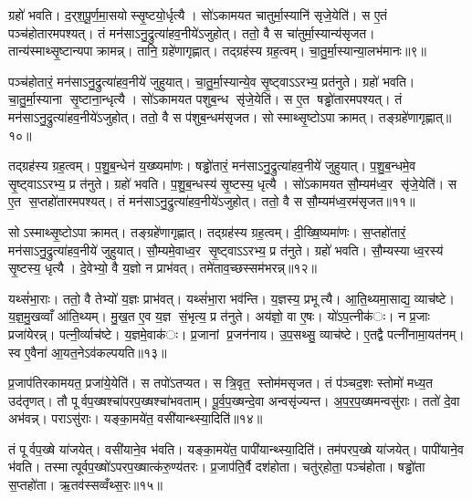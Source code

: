 ग्रहो॑ भवति। द॒र्‌श॒पू॒र्ण॒मा॒सयोस्सृ॒ष्टयो॒र्धृत्यै। सो॑ऽकामयत चातुर्मा॒स्यानि॑ सृजे॒येति॑। स ए॒तं पञ्च॑होतारमपश्यत्। तं मन॑साऽनु॒द्रुत्या॑हव॒नीये॑ऽजुहोत्। ततो॒ वै स चा॑तुर्मा॒स्यान्य॑सृजत। तान्य॑स्माथ्सृ॒ष्टान्यपाक्रामन्न्। तानि॒ ग्रहे॑णागृह्णात्। तद्ग्रह॑स्य ग्रह॒त्वम्। चा॒तु॒र्मा॒स्यान्या॒लभ॑मानः॥९॥

पञ्च॑होतारं॒ मन॑साऽनु॒द्रुत्या॑हव॒नीये॑ जुहुयात्। चा॒तु॒र्मा॒स्यान्ये॒व सृ॒ष्ट्वाऽऽरभ्य॒ प्रत॑नुते। ग्रहो॑ भवति। चा॒तु॒र्मा॒स्याना सृ॒ष्टाना॒न्धृत्यै। सो॑ऽकामयत पशुब॒न्ध सृ॑जे॒येति॑। स ए॒त षड्ढो॑तारमपश्यत्। तं मन॑साऽनु॒द्रुत्या॑हव॒नीये॑ऽजुहोत्। ततो॒ वै स प॑शुब॒न्धम॑सृजत। सोस्माथ्सृ॒ष्टोऽपाक्रामत्। तङ्ग्रहे॑णागृह्णात्॥१०॥

तद्ग्रह॑स्य ग्रह॒त्वम्। प॒शु॒ब॒न्धेन॑ य॒ख्ष्यमा॑णः। षड्ढो॑तारं॒ मन॑साऽनु॒द्रुत्या॑हव॒नीये॑ जुहुयात्। प॒शु॒ब॒न्धमे॒व सृ॒ष्ट्वाऽऽरभ्य॒ प्र त॑नुते। ग्रहो॑ भवति। प॒शु॒ब॒न्धस्य॑ सृ॒ष्टस्य॒ धृत्यै। सो॑ऽकामयत सौ॒म्यम॑ध्व॒र सृ॑जे॒येति॑। स ए॒त स॒प्तहो॑तारमपश्यत्। तं मन॑साऽनु॒द्रुत्या॑हव॒नीये॑ऽजुहोत्। ततो॒ वै स सौ॒म्यम॑ध्व॒रम॑सृजत॥११॥

सोऽस्माथ्सृ॒ष्टोऽपाक्रामत्। तङ्ग्रहे॑णागृह्णात्। तद्ग्रह॑स्य ग्रह॒त्वम्। दी॒ख्षि॒ष्यमा॑णः। स॒प्तहो॑तारं॒ मन॑साऽनु॒द्रुत्या॑हव॒नीये॑ जुहुयात्। सौ॒म्यमे॒वाध्व॒र सृ॒ष्ट्वाऽऽरभ्य॒ प्र त॑नुते। ग्रहो॑ भवति। सौ॒म्यस्याध्व॒रस्य॑ सृ॒ष्टस्य॒ धृत्यै। दे॒वेभ्यो॒ वै य॒ज्ञो न प्राभ॑वत्। तमे॑ताव॒च्छस्सम॑भरन्न्॥१२॥

यथ्सं॑भा॒राः। ततो॒ वै तेभ्यो॑ य॒ज्ञः प्राभ॑वत्। यथ्सं॑भा॒रा भव॑न्ति। य॒ज्ञस्य॒ प्रभूत्यै। आ॒ति॒थ्यमा॒साद्य॒ व्याच॑ष्टे। य॒ज्ञ॒मु॒खव्वाँ आ॑ति॒थ्यम्। मु॒ख॒त ए॒व य॒ज्ञ सं॒भृत्य॒ प्र त॑नुते। अय॑ज्ञो॒ वा ए॒षः। यो॑ऽप॒त्नीक॑ः। न प्र॒जाः प्रजा॑येरन्न्। पत्नी॒र्व्याच॑ष्टे। य॒ज्ञमे॒वाक॑ः। प्र॒जानां प्र॒जन॑नाय। उ॒प॒सथ्सु॒ व्याच॑ष्टे। ए॒तद्वै पत्नी॑नामा॒यत॑नम्। स्व ए॒वैना॑ आ॒यत॒नेऽव॑कल्पयति॥१३॥


प्र॒जाप॑तिरकामयत॒ प्रजा॑ये॒येति॑। स तपो॑ऽतप्यत। स त्रि॒वृत॒ स्तोम॑मसृजत। तं प॑ञ्चद॒शः स्तोमो॑ मध्य॒त उद॑तृणत्। तौ पूर्वप॒ख्षश्चा॑परप॒ख्षश्चा॑भवताम्। पू॒र्व॒प॒ख्षन्दे॒वा अन्वसृ॑ज्यन्त। अ॒प॒र॒प॒ख्षमन्वसु॑राः। ततो॑ दे॒वा अभ॑वन्न्। पराऽसु॑राः। यङ्का॒मये॑त॒ वसी॑यान्थ्स्या॒दिति॑॥१४॥

तं पूर्वप॒ख्षे या॑जयेत्। वसी॑याने॒व भ॑वति। यङ्का॒मये॑त॒ पापी॑यान्थ्स्या॒दिति॑। तम॑परप॒ख्षे या॑जयेत्। पापी॑याने॒व भ॑वति। तस्मात्पूर्वप॒ख्षो॑ऽपरप॒ख्षात्क॑रु॒ण्य॑तरः। प्र॒जाप॑ति॒र्वै दश॑होता। चतु॑र्‌होता॒ पञ्च॑होता। षड्ढो॑ता स॒प्तहो॑ता। ऋ॒तव॑स्सव्वँथ्स॒रः॥१५॥

